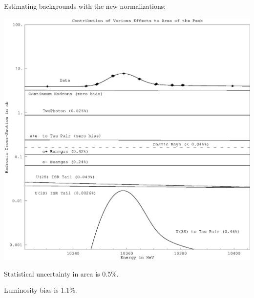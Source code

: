 \begin{slide*}

\slideframe{}
\huge
{}

\begin{minipage}[t]{\linewidth}
\LARGE

Estimating backgrounds with the new normalizations: \\
\begin{center}
  \includegraphics[width=0.8\linewidth]{all_backgrounds.eps}
\end{center}

Statistical uncertainty in area is 0.5\%.

Luminosity bias is 1.1\%.

\end{minipage}

\end{slide*}




